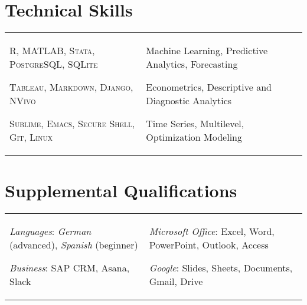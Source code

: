 \documentclass[a4paper,10pt]{article}
\begin{document}
\section{Technical Skills}
\begin{supertabular}{p{8.65cm} p{8.65cm}}

	\begin{enumerate*}[label =$\circ$, itemjoin={\newline}]
																\item \small \textsc{R, MATLAB, Stata, PostgreSQL, SQLite}
																\item \small \textsc{Tableau, Markdown, Django, NVivo}
																\item \small \textsc{Sublime, Emacs, Secure Shell, Git, Linux}
																\end{enumerate*}


	& \begin{enumerate*}[label =$\circ$, itemjoin={\newline}]
                                \item \small Machine Learning, Predictive Analytics, Forecasting
                                \item \small Econometrics, Descriptive and Diagnostic Analytics
                                \item \small Time Series, Multilevel, Optimization Modeling \end{enumerate*}  \vspace{1mm} \\



\end{supertabular}



\smallskip
\section{Supplemental Qualifications}
\begin{supertabular}{p{8.65cm} p{8.65cm}}
	\begin{enumerate*}[label =$\circ$, itemjoin={\newline}]
		\item \small \emph{Languages}: \emph{German} (advanced), \emph{Spanish} (beginner)
	 	\item \small \emph{Business}: SAP CRM, Asana, Slack
	\end{enumerate*}

	& \begin{enumerate*}[label =$\circ$, itemjoin={\newline}]
	 	\item \small \emph{Microsoft Office}: Excel, Word, PowerPoint, Outlook, Access
	 	\item \small \emph{Google}: Slides, Sheets, Documents, Gmail, Drive
	\end{enumerate*} \\

\end{supertabular}
\end{document}
